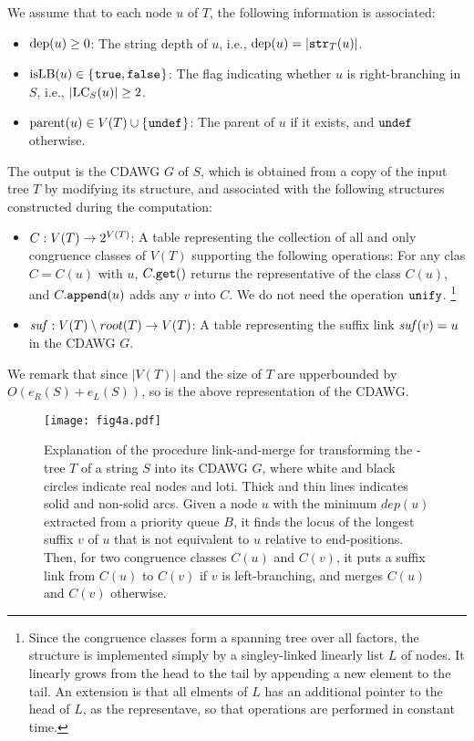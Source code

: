 We assume that to each node $u$ of $T$, the following information is associated:
\begin{itemize}
\item $\mathrm{dep}(u)\ge 0$: The string depth of $u$, i.e., $\mathrm{dep}(u) = |\mathtt{str}_T(u)|$.
\item $\mathrm{isLB}(u) \in \{\kern0.05em\tt true, false\kern0.05em\}$: The flag indicating whether $u$ is right-branching in $S$, i.e., $|\mathrm{LC}_{S}(u)|\ge 2$. 
\item $\mathrm{parent}(u) \in V(T)\cup\{\kern0.05em\mathtt{undef}\kern0.05em\}$: The parent of $u$ if it exists, and $\mathtt{undef}$ otherwise. 
\end{itemize}

The output is the CDAWG $G$ of $S$, which is obtained from a copy of the input tree $T$ by modifying its structure, and associated with 
the following structures constructed during the computation: 
\begin{itemize}
\item $C: V(T) \to 2^{V(T)}$: A table representing the collection of all and only congruence classes of $V(T)$ supporting the following operations:
  For any clas $C = C(u)$ with $u$,  $C.\mathtt{get}()$ returns the representative of the class $C(u)$, and $C.\mathtt{append}(u)$ adds any $v$ into $C$. We do not need the operation $\mathtt{unify}$.%
\footnote{Since the congruence classes form a spanning tree over all factors, the structure is implemented simply by a singley-linked linearly list $L$ of nodes. It linearly grows from the head to the tail by appending a new element to the tail. An extension is that all elments of $L$ has an additional pointer to the head of $L$, as the representave, so that operations are performed in constant time.
}
  
\item $\mathit{suf}: V(T)\setminus{root(T)} \to V(T)$: A table representing the suffix link $\mathit{suf}(v) = u$ in the CDAWG $G$. 
\end{itemize}

We remark that since $|V(T)|$ and the size of $T$ are upperbounded by $O(e_R(S) + e_L(S))$, so is the above representation of the CDAWG. 


\begin{figure}[t]
\centering
\texttt{[image: fig4a.pdf]}
\vspace{.5\baselineskip}
\caption{Explanation of the procedure link-and-merge for transforming the \LPTrm-tree $T$ of a string $S$ into its CDAWG $G$, where white and black circles indicate real nodes and loti. Thick and thin lines indicates solid and non-solid arcs. Given a node $u$ with the minimum $dep(u)$ extracted from a priority queue $B$, it finds the locus of the longest suffix $v$ of $u$ that is not equivalent to $u$ relative to end-positions. Then,
  for two congruence classes $C(u)$ and $C(v)$, 
  it puts a suffix link from $C(u)$ to $C(v)$ if $v$ is left-branching, and merges $C(u)$ and $C(v)$ otherwise. 
}\label{fig:three:suffix:link}
\end{figure}

